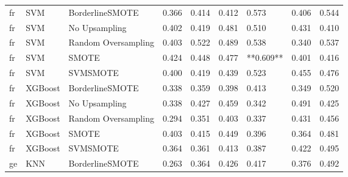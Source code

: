 \begin{tabular}{lllllllll}
      fr &                          SVM &     BorderlineSMOTE & 0.366 &                     0.414 &                 0.412 &                  0.573 &                                   0.406 &     0.544 \\
      fr &                          SVM &       No Upsampling & 0.402 &                     0.419 &                 0.481 &                  0.510 &                                   0.431 &     0.410 \\
      fr &                          SVM & Random Oversampling & 0.403 &                     0.522 &                 0.489 &                  0.538 &                                   0.340 &     0.537 \\
      fr &                          SVM &               SMOTE & 0.424 &                     0.448 &                 0.477 &              **0.609** &                                   0.401 &     0.416 \\
      fr &                          SVM &            SVMSMOTE & 0.400 &                     0.419 &                 0.439 &                  0.523 &                                   0.455 &     0.476 \\
      fr &                      XGBoost &     BorderlineSMOTE & 0.338 &                     0.359 &                 0.398 &                  0.413 &                                   0.349 &     0.520 \\
      fr &                      XGBoost &       No Upsampling & 0.338 &                     0.427 &                 0.459 &                  0.342 &                                   0.491 &     0.425 \\
      fr &                      XGBoost & Random Oversampling & 0.294 &                     0.351 &                 0.403 &                  0.337 &                                   0.431 &     0.456 \\
      fr &                      XGBoost &               SMOTE & 0.403 &                     0.415 &                 0.449 &                  0.396 &                                   0.364 &     0.481 \\
      fr &                      XGBoost &            SVMSMOTE & 0.364 &                     0.361 &                 0.413 &                  0.387 &                                   0.422 &     0.495 \\
      ge &                          KNN &     BorderlineSMOTE & 0.263 &                     0.364 &                 0.426 &                  0.417 &                                   0.376 &     0.492 \\

\end{tabular}
